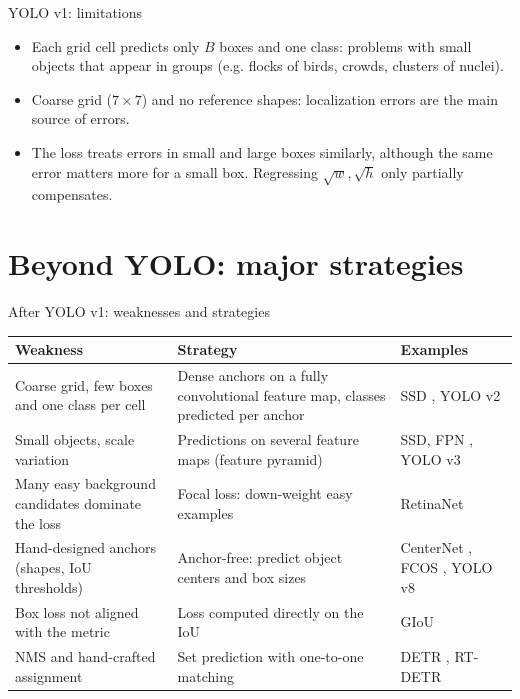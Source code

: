 \documentclass[xcolor=pdftex,dvipsnames,table]{beamer}
\begin{document}
\begin{frame}{YOLO v1: limitations}
\begin{itemize}
   \item Each grid cell predicts only $B$ boxes and one class: problems with small objects that appear in groups (e.g. flocks of birds, crowds, clusters of nuclei).
   \item Coarse grid ($7 \times 7$) and no reference shapes: localization errors are the main source of errors.
   \item The loss treats errors in small and large boxes similarly, although the same error matters more for a small box. Regressing $\sqrt{w}, \sqrt{h}$ only partially compensates.
\end{itemize}
\end{frame}


\section{Beyond YOLO: major strategies}


\begin{frame}{After YOLO v1: weaknesses and strategies}
\centering
\tiny
\renewcommand{\arraystretch}{1.45}
\begin{tabular}{|>{\raggedright\arraybackslash}p{2.6cm}|>{\raggedright\arraybackslash}p{4.4cm}|>{\raggedright\arraybackslash}p{2.6cm}|}
\hline
\textbf{Weakness} & \textbf{Strategy} & \textbf{Examples} \\
\hline
Coarse grid, few boxes and one class per cell & Dense anchors on a fully convolutional feature map, classes predicted per anchor & SSD \cite{Liu2016}, YOLO v2 \cite{Redmon2017} \\
\hline
Small objects, scale variation & Predictions on several feature maps (feature pyramid) & SSD, FPN \cite{Lin2017FPN}, YOLO v3 \\
\hline
Many easy background candidates dominate the loss & Focal loss: down-weight easy examples & RetinaNet \cite{Lin2017Focal} \\
\hline
Hand-designed anchors (shapes, IoU thresholds) & Anchor-free: predict object centers and box sizes & CenterNet \cite{Zhou2019}, FCOS \cite{Tian2019}, YOLO v8 \\
\hline
Box loss not aligned with the metric & Loss computed directly on the IoU & GIoU \cite{Rezatofighi2019} \\
\hline
NMS and hand-crafted assignment & Set prediction with one-to-one matching & DETR \cite{Carion2020}, RT-DETR \cite{Zhao2024} \\
\hline
\end{tabular}
\end{frame}
\end{document}
